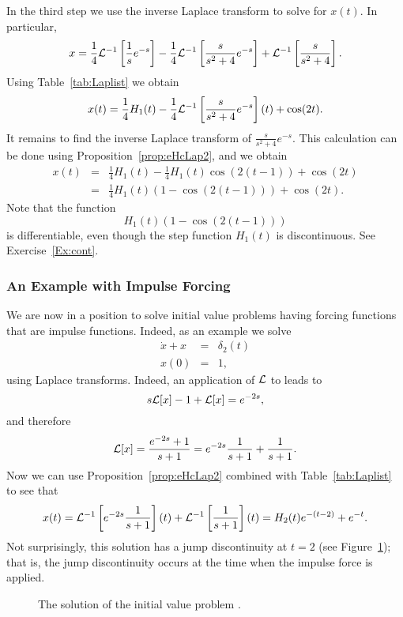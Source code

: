 \documentclass{ximera}
\begin{document}
In the third step we use the inverse Laplace transform to solve for $x(t)$. 
In particular,
\[
x = \frac{1}{4}{\cal L}^{-1}\left[\frac{1}{s}e^{-s}\right] - 
\frac{1}{4}{\cal L}^{-1}\left[\frac{s}{s^2+4}e^{-s}\right] + 
{\cal L}^{-1}\left[\frac{s}{s^2+4}\right].
\]
Using Table~\ref{tab:Laplist} we obtain
\[
x(t) = \frac{1}{4}H_1(t) - 
\frac{1}{4}{\cal L}^{-1}\left[\frac{s}{s^2+4}e^{-s}\right](t) + \cos(2t).
\]
It remains to find the inverse Laplace transform of $\frac{s}{s^2+4}e^{-s}$.  
This calculation can be done using Proposition~\ref{prop:eHcLap2}, and we 
obtain
\begin{eqnarray*}
x(t) & = & \frac{1}{4}H_1(t) - \frac{1}{4}H_1(t)\cos(2(t-1)) + \cos(2t) \\
& = & \frac{1}{4}H_1(t)(1-\cos(2(t-1))) + \cos(2t).
\end{eqnarray*}
Note that the function 
\[
H_1(t)(1-\cos(2(t-1)))
\]
is differentiable, even though the step function $H_1(t)$ is discontinuous.
See Exercise~\ref{Ex:cont}.

\subsubsection*{An Example with Impulse Forcing}

We are now in a position to solve initial value problems having forcing 
functions that are impulse functions.   Indeed, as an example we solve
\begin{equation}  \label{eq:delta1}
\begin{array}{rcl}
\dot x + x & = & \delta_2(t)\\
x(0) & = & 1,
\end{array}
\end{equation}
using Laplace transforms.  Indeed, an application of ${\cal L}$ to
 leads to
\[
s{\cal L}[x]-1 + {\cal L}[x] = e^{-2s},
\]
and therefore
\[
{\cal L}[x]=\frac{e^{-2s}+1}{s+1}=e^{-2s}\frac{1}{s+1}+\frac{1}{s+1}.
\]
Now we can use Proposition~\ref{prop:eHcLap2} combined with 
Table~\ref{tab:Laplist} to see that
\[
x(t) = {\cal L}^{-1}\left[e^{-2s}\frac{1}{s+1}\right](t)+ 
{\cal L}^{-1}\left[\frac{1}{s+1}\right](t) = 
H_2(t)e^{-(t-2)} + e^{-t}.
\]
Not surprisingly, this solution has a jump discontinuity at $t=2$ (see 
Figure~\ref{fig:delta1sol}); that is, the jump discontinuity occurs at 
the time when the impulse force is applied.
\begin{figure}[htb]
           \centerline{%
           }
           \caption{The solution of the initial value problem
	   \protect{}.}
           \label{fig:delta1sol}
\end{figure}
\end{document}
